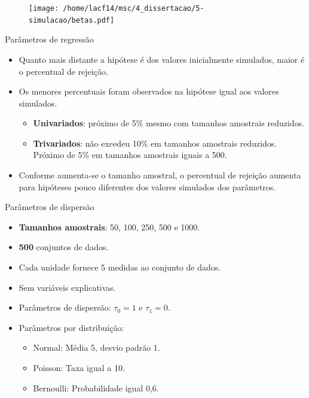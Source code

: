 \documentclass[
  ignorenonframetext,
  serif,
  professionalfont,
  usenames,
  dvipsnames,
  aspectratio = 169]{beamer}
\def\endColumns{\end{minipage}}%
\def\beginAHalfColumnT{\begin{minipage}[t]{0.49\textwidth}}%
\begin{document}
\begin{frame}{}
\protect\hypertarget{section}{}
\begin{figure}[H]
\centering
\texttt{[image: /home/lacf14/msc/4\_dissertacao/5-simulacao/betas.pdf]}
\end{figure}
\end{frame}

\begin{frame}{Parâmetros de regressão}
\protect\hypertarget{paruxe2metros-de-regressuxe3o-2}{}
\begin{itemize}
  \itemsep 2ex
  
  \item Quanto mais distante a hipótese é dos valores inicialmente simulados, maior é o percentual de rejeição. 
  
  \item Os menores percentuais foram observados na hipótese igual aos valores simulados. 
    \begin{itemize}
      \item \textbf{Univariados}: próximo de 5\% mesmo com tamanhos amostrais reduzidos. 
      \item \textbf{Trivariados}: não excedeu 10\% em tamanhos amostrais reduzidos. Próximo de 5\% em tamanhos amostrais iguais a 500.
    \end{itemize}

  \item Conforme aumenta-se o tamanho amostral, o percentual de rejeição aumenta para hipóteses pouco diferentes dos valores simulados dos parâmetros.

\end{itemize}
\end{frame}

\begin{frame}{Parâmetros de dispersão}
\protect\hypertarget{paruxe2metros-de-dispersuxe3o}{}
\beginAHalfColumnT
  \begin{itemize}
    \itemsep 2ex
    \item \textbf{Tamanhos amostrais}: 50, 100, 250, 500 e 1000.
  \item \textbf{500} conjuntos de dados.
  \item Cada unidade fornece 5 medidas ao conjunto de dados.
  \item Sem variáveis explicativas.
  \item Parâmetros de dispersão: $\tau_0 = 1$ e $\tau_1 = 0$.
\end{itemize}

\endColumns
\beginAHalfColumnT

\begin{itemize}
    \itemsep 2ex
    \item Parâmetros por distribuição:
    \begin{itemize}
        \item Normal: Média 5, desvio padrão 1.
        \item Poisson: Taxa igual a 10.
        \item Bernoulli: Probabilidade igual 0,6.
    \end{itemize}
  \end{itemize}
\endColumns
\end{frame}
\end{document}
